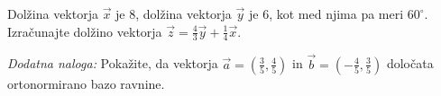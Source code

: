 \documentclass[addpoints]{exam}
\begin{document}
\begin{questions}

\begin{solution}[4cm]

\end{solution}


\newpage




    \question[4]
    Dolžina vektorja $\overrightarrow{x}$ je $8$, dolžina vektorja $\overrightarrow{y}$ je $6$, 
    kot med njima pa meri $60^\circ$. 
    Izračunajte dolžino vektorja $\overrightarrow{z}=\frac{4}{3}\overrightarrow{y}+\frac{1}{4}\overrightarrow{x}$.
        


    \begin{solution}[10cm]

    \end{solution}





    \bonusquestion[3]
    \textit{Dodatna naloga:} Pokažite, da vektorja $\overrightarrow{a}=\left(\frac{3}{5},\frac{4}{5}\right)$ in $\overrightarrow{b}=\left(-\frac{4}{5},\frac{3}{5}\right)$ določata ortonormirano bazo ravnine.

    \begin{solution}[1cm]

    \end{solution}

\end{questions}
\end{document}
